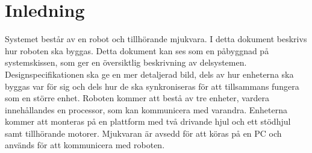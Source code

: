 \section{Inledning}
Systemet består av en robot och tillhörande mjukvara. I detta dokument beskrivs hur roboten ska byggas. Detta dokument kan ses som en påbyggnad på systemskissen, som ger en översiktlig beskrivning av delsystemen. Designspecifikationen ska ge en mer detaljerad bild, dels av hur enheterna ska byggas var för sig och dels hur de ska synkroniseras för att tillsammans fungera som en större enhet.
Roboten kommer att bestå av tre enheter, vardera innehållandes en processor, som kan kommunicera med varandra. 
Enheterna kommer att monteras på en plattform med två drivande hjul och ett stödhjul samt tillhörande motorer.
Mjukvaran är avsedd för att köras på en PC och används för att kommunicera med roboten. 

\begin{figure}[H]
\centering
\end{figure}
